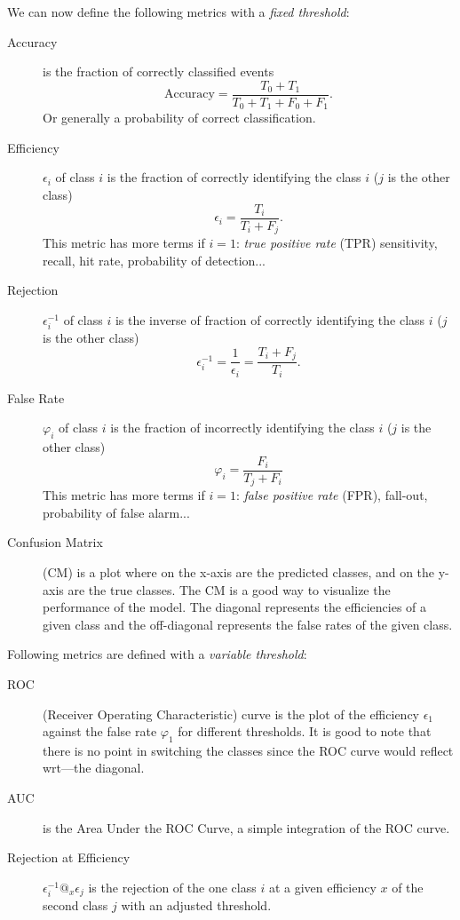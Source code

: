 We can now define the following metrics with a \emph{fixed threshold}:
\begin{description}
    \item[Accuracy] is the fraction of correctly classified events
    \begin{equation}
        \label{eq:accuracy}
        \text{Accuracy} = \frac{T_0 + T_1}{T_0 + T_1 + F_0 + F_1}.
    \end{equation}
    Or generally a probability of correct classification.
    \item[Efficiency] $\epsilon_i$ of class $i$ is the fraction of correctly identifying the class $i$ ($j$ is the other class)
    \begin{equation}
        \label{eq:efficiency}
        \epsilon_i = \frac{T_i}{T_i + F_j}.
    \end{equation}
    This metric has more terms if $i = 1$: \emph{true positive rate} (TPR) sensitivity, recall, hit rate, probability of detection...
    \item[Rejection] $\epsilon^{-1}_i$ of class $i$ is the inverse of fraction of correctly identifying the class $i$ ($j$ is the other class)
    \begin{equation}
        \label{eq:rejection}
        \epsilon^{-1}_i = \frac{1}{\epsilon_i} = \frac{T_i + F_j}{T_i}.
    \end{equation}
    \item[False Rate] $\varphi_i$ of class $i$ is the fraction of incorrectly identifying the class $i$ ($j$ is the other class)
    \begin{equation}
        \label{eq:false_rate}
        \varphi_i = \frac{F_i}{T_j + F_i}
    \end{equation}
    This metric has more terms if $i = 1$: \emph{false positive rate} (FPR), fall-out, probability of false alarm...
    \item[Confusion Matrix] (CM) is a plot where on the x-axis are the predicted classes, and on the y-axis are the true classes. 
    The CM is a good way to visualize the performance of the model. 
    The diagonal represents the efficiencies of a given class and the off-diagonal represents the false rates of the given class.
\end{description}

Following metrics are defined with a \emph{variable threshold}:
\begin{description}
    \item [ROC] (Receiver Operating Characteristic) curve is the plot of the efficiency $\epsilon_1$ against the false rate $\varphi_1$ for different thresholds. 
    It is good to note that there is no point in switching the classes since the ROC curve would reflect wrt—the diagonal. 
    \item[AUC] is the Area Under the ROC Curve, a simple integration of the ROC curve.
    \item[Rejection at Efficiency] $\epsilon^{-1}_i @_x \epsilon_j$ is the rejection of the one class $i$ at a given efficiency $x$ of the second class $j$ with an adjusted threshold.
\end{description}



